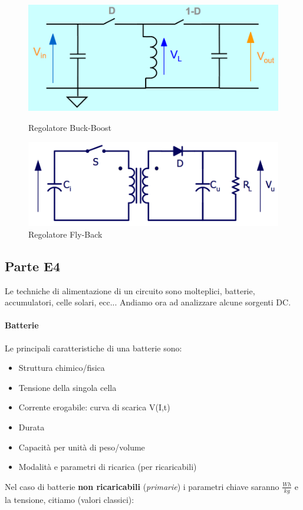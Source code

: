 \documentclass[12pt]{article}
\begin{document}
\begin{figure}[!hbpt]
  \centering
  \begin{minipage}{.45\textwidth}
    \centering
    \includegraphics[width=\linewidth]{images/buckboost.png}
    \caption{Regolatore Buck-Boost}
    \label{fig:buckboost}
  \end{minipage}\hfill
  \begin{minipage}{.45\textwidth}
    \centering
    \includegraphics[width=\linewidth]{images/flyback.png}
    \caption{Regolatore Fly-Back}
    \label{fig:flyback}
  \end{minipage}\hfill
\end{figure}

\subsection{Parte E4}\label{e4} %
Le techniche di alimentazione di un circuito sono molteplici, batterie, accumulatori, celle solari, ecc... Andiamo ora ad analizzare alcune sorgenti DC.
\paragraph{Batterie} Le principali caratteristiche di una batterie sono:
\begin{itemize}
  \item Struttura chimico/fisica
  \item Tensione della singola cella
  \item Corrente erogabile: curva di scarica V(I,t)
  \item Durata
  \item Capacità per unità di peso/volume
  \item Modalità e parametri di ricarica (per ricaricabili)
\end{itemize}
Nel caso di batterie \textbf{non ricaricabili} (\textit{primarie}) i parametri chiave saranno $\frac{Wh}{kg}$ e la tensione, citiamo (valori classici):
\end{document}
